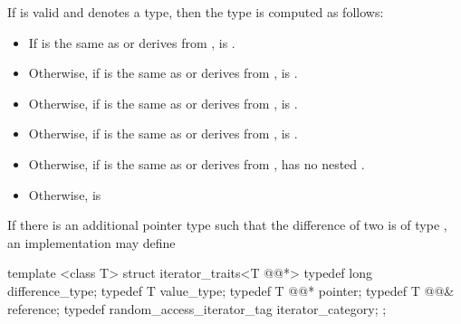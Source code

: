 \begin{addedblock}
\pnum
If
 is valid and denotes a type, then the
type  is computed as follows:
\begin{itemize}
\item If  is the same as or derives from ,
       is .
\item Otherwise, if  is the same as or derives from ,
       is .
\item Otherwise, if  is the same as or derives from ,
       is .
\item Otherwise, if  is the same as or derives from ,
       is .
\item Otherwise, if  is the same as or derives from ,
       has no nested .
\item Otherwise,  is 
\end{itemize}
\end{addedblock}

\begin{removedblock}
\pnum
\enternote
If there is an additional pointer type
such that the difference of two
is of type
,
an implementation may define

\begin{codeblock}
  template <class T> struct iterator_traits<T @@*> {
    typedef long difference_type;
    typedef T value_type;
    typedef T @@* pointer;
    typedef T @@& reference;
    typedef random_access_iterator_tag iterator_category;
  };
\end{codeblock}
\exitnote
\end{removedblock}

